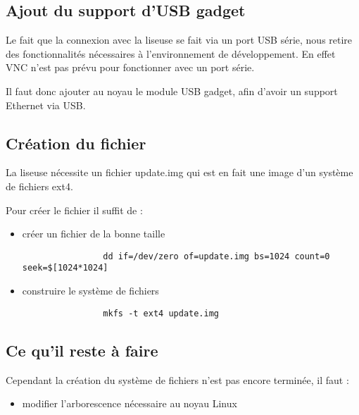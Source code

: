  \subsection{Ajout du support d'USB gadget}
 
 Le fait que la connexion avec la liseuse se fait via un port USB série, nous retire des fonctionnalités nécessaires à l'environnement de développement. En effet VNC n'est pas prévu pour fonctionner avec un port série.
 
 Il faut donc ajouter au noyau le module USB gadget, afin d'avoir un support Ethernet via USB.

\subsection{Création du fichier}

La liseuse nécessite un fichier update.img qui est en fait une image d'un système de fichiers ext4.

Pour créer le fichier il suffit de : 
	\begin{itemize}
		\item créer un fichier de la bonne taille \\
			\begin{verbatim}
				dd if=/dev/zero of=update.img bs=1024 count=0 seek=$[1024*1024]
			\end{verbatim}
		\item construire le système de fichiers \\
			\begin{verbatim}
				mkfs -t ext4 update.img
			\end{verbatim}
	\end{itemize}

\subsection{Ce qu'il reste à faire}

Cependant la création du système de fichiers n'est pas encore terminée, il faut :
	\begin{itemize}
		\item modifier l'arborescence nécessaire au noyau Linux
	\end{itemize}